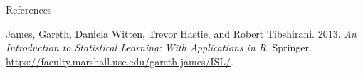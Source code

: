 \documentclass[
  ignorenonframetext,
]{beamer}
\begin{document}
\begin{frame}{References}
\protect\hypertarget{references}{}

\hypertarget{refs}{}
\leavevmode\hypertarget{ref-islr}{}%
James, Gareth, Daniela Witten, Trevor Hastie, and Robert Tibshirani.
2013. \emph{An Introduction to Statistical Learning: With Applications
in R}. Springer.
\url{https://faculty.marshall.usc.edu/gareth-james/ISL/}.

\end{frame}
\end{document}
